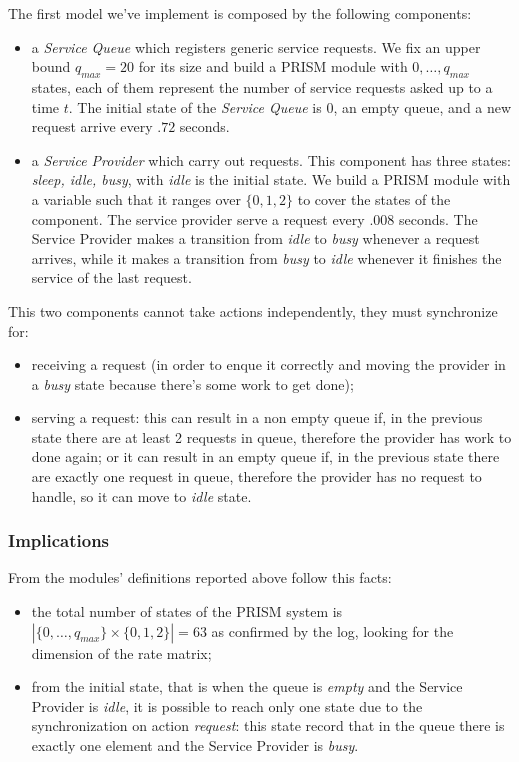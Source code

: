 The first model we've implement is composed by the following
components:
\begin{itemize}
\item a \emph{Service Queue} which registers generic service
  requests. We fix an upper bound $q_{max} = 20$ for its size and
  build a PRISM module with $0,\ldots,q_{max}$ states, each of them
  represent the number of service requests asked up to a time $t$. The
  initial state of the \emph{Service Queue} is $0$, an empty queue,
  and a new request arrive every $.72$ seconds.
\item a \emph{Service Provider} which carry out requests. This
  component has three states: \emph{sleep, idle, busy}, with
  \emph{idle} is the initial state. We build a PRISM module with a
  variable such that it ranges over $\{0,1,2\}$ to cover the states of
  the component. The service provider serve a request every $.008$
  seconds. The Service Provider makes a transition from \emph{idle} to
  \emph{busy} whenever a request arrives, while it makes a transition
  from \emph{busy} to \emph{idle} whenever it finishes the service of
  the last request.
\end{itemize}
This two components cannot take actions independently, they must
synchronize for:
\begin{itemize}
\item receiving a request (in order to enque it correctly and moving
  the provider in a \emph{busy} state because there's some work to get
  done);
\item serving a request: this can result in a non empty queue if, in
  the previous state there are at least 2 requests in queue, therefore
  the provider has work to done again; or it can result in an empty
  queue if, in the previous state there are exactly one request in
  queue, therefore the provider has no request to handle, so it can
  move to \emph{idle} state.
\end{itemize}

\subsubsection{Implications}

From the modules' definitions reported above follow this facts:
\begin{itemize}
\item the total number of states of the PRISM system is
  $|\{0,\ldots,q_{max}\} \times \{0,1,2\}| = 63$ as confirmed by the
  log, looking for the dimension of the rate matrix;
\item from the initial state, that is when the queue is \emph{empty}
  and the Service Provider is \emph{idle}, it is possible to reach
  only one state due to the synchronization on action \emph{request}:
  this state record that in the queue there is exactly one element and
  the Service Provider is \emph{busy}.
\end{itemize}

